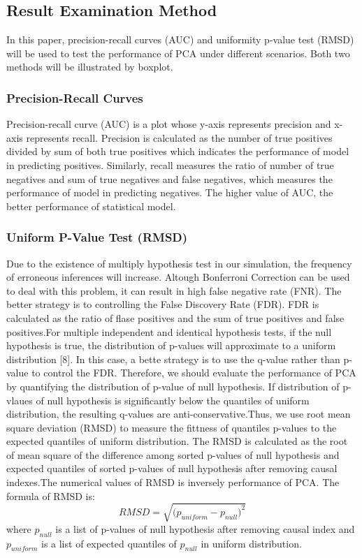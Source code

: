 \documentclass[12pt]{article}
\theoremstyle{definition}
\theoremstyle{plain}
\begin{document}
\subsection{Result Examination Method}
In this paper, precision-recall curves (AUC) and uniformity p-value test (RMSD) will be used to test the performance of PCA under different scenarios. Both two methods will be illustrated by boxplot.
\subsubsection{Precision-Recall Curves}
Precision-recall curve (AUC) is a plot whose y-axis represents precision and x-axis represents recall. Precision is calculated as the number of true positives divided by sum of both true positives which indicates the performance of model in predicting positives. Similarly, recall measures the ratio of number of true negatives and sum of true negatives and false negatives, which measures the performance of model in predicting negatives. The higher value of AUC, the better performance of statistical model.
\subsubsection{Uniform P-Value Test (RMSD)}
Due to the existence of multiply hypothesis test in our simulation, the frequency of erroneous inferences will increase. Altough Bonferroni Correction can be used to deal with this problem, it can result in high false negative rate (FNR). The better strategy is to controlling the False Discovery Rate (FDR). FDR is calculated as the ratio of flase positives and the sum of true positives and false positives.For multiple independent and identical hypothesis tests, if the null hypothesis is true, the distribution of p-values will approximate to a uniform distribution [8]. In this case, a bette strategy is to use the q-value rather than p-value to control the FDR. Therefore, we should evaluate the performance of PCA by quantifying the distribution of p-value of null hypothesis. If distribution of p-vlaues of null hypothesis is significantly below the quantiles of uniform distribution, the resulting q-values are anti-conservative.Thus, we use root mean square deviation (RMSD) to measure the fittness of quantiles p-values to the expected quantiles of uniform distribution. The RMSD is calculated as the root of mean square of the difference among sorted p-values of null hypothesis and expected quantiles of sorted p-values of null hypothesis after removing causal indexes.The numerical values of RMSD is inversely  performance of PCA. The formula of RMSD is:
$$RMSD=\sqrt{{(p_{uniform}-p_{null}})^2}$$
where $p_{null}$ is a list of p-values of null hypothesis after removing causal index and $p_{uniform}$ is a list of expected quantiles of $p_{null}$ in uniform distribution. \\
\end{document}
